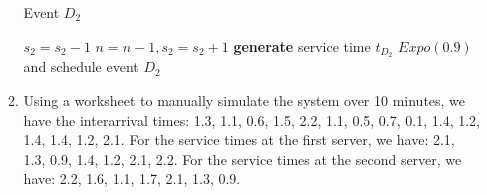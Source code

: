 \documentclass{article}
\begin{document}
\begin{enumerate}
\begin{enumerate}
\begin{algorithm}[H]
\caption{Event $D_2$}
\begin{algorithmic}[1]
    \STATE $s_2 = s_2 - 1$
        \STATE $n = n - 1, s_2 = s_2 + 1$
        \STATE \textbf{generate} service time $t_D_2$ $Expo(0.9)$ and schedule event $D_2$
    \ENDIF
\end{algorithmic}
\end{algorithm}

\newpage
    \item Using a worksheet to manually simulate the system over 10 minutes, we have the interarrival times: 1.3, 1.1, 0.6, 1.5, 2.2, 1.1, 0.5, 0.7, 0.1, 1.4, 1.2, 1.4, 1.4, 1.2, 2.1. For the service times at the first server, we have: 2.1, 1.3, 0.9, 1.4, 1.2, 2.1, 2.2. For the service times at the second server, we have: 2.2, 1.6, 1.1, 1.7, 2.1, 1.3, 0.9.\\


\end{enumerate}
\end{enumerate}
\end{document}
